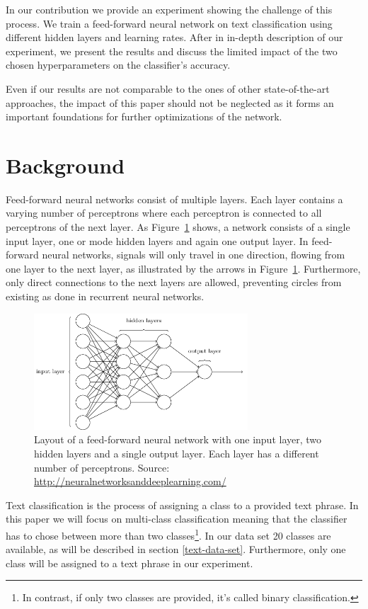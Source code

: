 \documentclass[sigconf]{acmart}
\begin{document}
In our contribution we provide an experiment showing the challenge of this process. We train a feed-forward neural network on text classification using different hidden layers and learning rates. After in in-depth description of our experiment, we present the results and discuss the limited impact of the two chosen hyperparameters on the classifier's accuracy.

Even if our results are not comparable to the ones of other state-of-the-art approaches, the impact of this paper should not be neglected as it forms an important foundations for further optimizations of the network.

\section{Background}

Feed-forward neural networks consist of multiple layers. Each layer contains a varying number of perceptrons where each perceptron is connected to all perceptrons of the next layer\cite{nielsenneural}. As Figure~\ref{fig:layers} shows, a network consists of a single input layer, one or mode hidden layers and again one output layer. In feed-forward neural networks, signals will only travel in one direction, flowing from one layer to the next layer, as illustrated by the arrows in Figure~\ref{fig:layers}. Furthermore, only direct connections to the next layers are allowed, preventing circles from existing as done in recurrent neural networks. 

\begin{figure}
	\centering
	\includegraphics[width=8cm]{layers.png}
	\caption{Layout of a feed-forward neural network with one input layer, two hidden layers and a single output layer. Each layer has a different number of perceptrons. Source: \href{http://neuralnetworksanddeeplearning.com/chap1.html}{http://neuralnetworksanddeeplearning.com/}}
	\label{fig:layers}
\end{figure}

Text classification is the process of assigning a class to a provided text phrase. In this paper we will focus on multi-class classification meaning that the classifier has to chose between more than two classes\footnote{In contrast, if only two classes are provided, it's called binary classification.}. In our data set 20 classes are available, as will be described in section \ref{text-data-set}. Furthermore, only one class will be assigned to a text phrase in our experiment.
\end{document}
